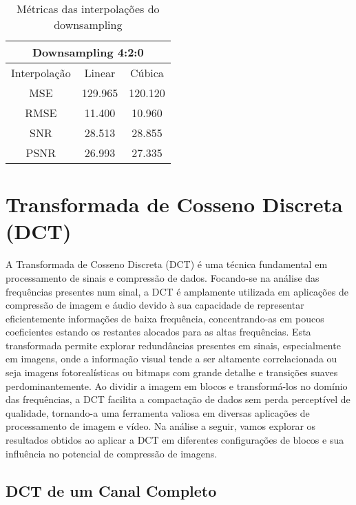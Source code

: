 \documentclass{article}
\begin{document}
\begin{table}
    \centering
    \begin{tabular}{|c|c|c|}
        \hline
        \multicolumn{3}{|c|}{Downsampling 4:2:0} \\
        \hline
        Interpolação & Linear & Cúbica\\
        \hline
        MSE & 129.965 & 120.120 \\
        \hline
        RMSE & 11.400 & 10.960 \\
        \hline
        SNR & 28.513 &  28.855 \\
        \hline
        PSNR & 26.993 & 27.335 \\
        \hline
    \end{tabular}
    \caption{Métricas das interpolações do downsampling}
\end{table}

\newpage

\section{Transformada de Cosseno Discreta (DCT)}
A Transformada de Cosseno Discreta (DCT) é uma técnica fundamental em processamento de sinais e compressão de dados. Focando-se na análise das frequências presentes num 
sinal, a DCT é amplamente utilizada em aplicações de compressão de imagem e áudio devido à sua capacidade de representar eficientemente informações de baixa frequência, concentrando-as 
em poucos coeficientes estando os restantes alocados para as altas frequências. Esta transformada permite explorar redundâncias presentes em sinais, especialmente em imagens, onde a informação visual 
tende a ser altamente correlacionada ou seja imagens fotorealísticas ou bitmaps com grande detalhe e transições suaves perdominantemente. Ao dividir a imagem em blocos e transformá-los no domínio das 
frequências, a DCT facilita a compactação de dados sem perda perceptível de qualidade, tornando-a uma ferramenta valiosa em diversas aplicações de processamento de imagem e vídeo. Na análise a seguir, vamos explorar os resultados obtidos ao aplicar a DCT em diferentes configurações de blocos e sua influência no potencial de compressão de imagens.

\subsection{DCT de um Canal Completo}
\end{document}
